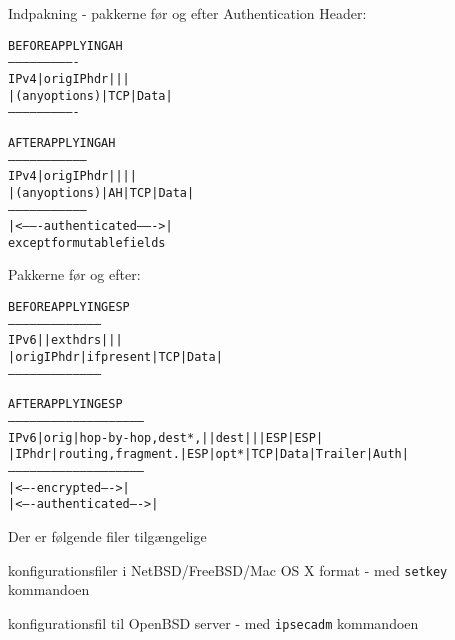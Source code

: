 \documentclass[Screen16to9,17pt,footrule]{foils}
\begin{document}

Indpakning - pakkerne før og efter Authentication Header:
\begin{alltt}
\small
                BEFORE APPLYING AH
            ----------------------------
      IPv4  |orig IP hdr  |     |      |
            |(any options)| TCP | Data |
            ----------------------------

                  AFTER APPLYING AH
            ---------------------------------
      IPv4  |orig IP hdr  |    |     |      |
            |(any options)| AH | TCP | Data |
            ---------------------------------
            |<------- authenticated ------->|
                 except for mutable fields
\end{alltt}


Pakkerne før og efter:
\begin{alltt}
\small
               BEFORE APPLYING ESP
         ---------------------------------------
   IPv6  |             | ext hdrs |     |      |
         | orig IP hdr |if present| TCP | Data |
         ---------------------------------------



               AFTER APPLYING ESP
         ---------------------------------------------------------
   IPv6  | orig |hop-by-hop,dest*,|   |dest|   |    | ESP   | ESP|
         |IP hdr|routing,fragment.|ESP|opt*|TCP|Data|Trailer|Auth|
         ---------------------------------------------------------
                                   |<---- encrypted ---->|
                               |<---- authenticated ---->|
\end{alltt}


\begin{list1}
\item Der er følgende filer tilgængelige\\
  \begin{list2}
  \item konfigurationsfiler i NetBSD/FreeBSD/Mac OS X format - med
    \verb+setkey+ kommandoen
  \item konfigurationsfil til OpenBSD server - med \verb+ipsecadm+
    kommandoen
  \end{list2}
\end{list1}
\end{document}
